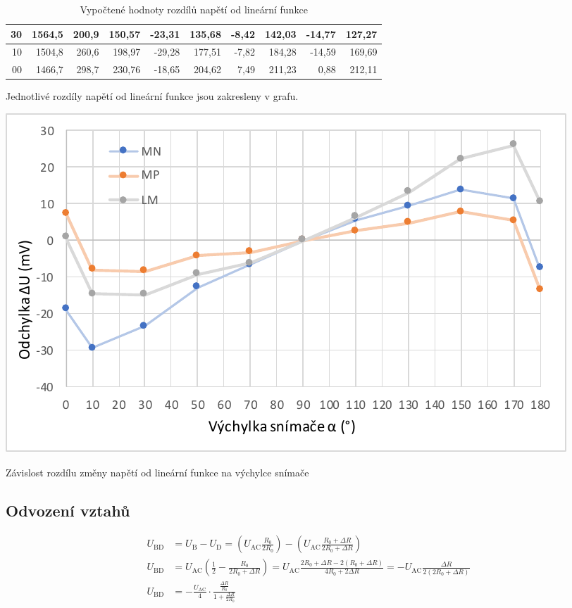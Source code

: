 \documentclass[a4paper,12pt]{article}   %
\begin{document}
\begin{table}[]
\begin{tabular}{|r|r|r||r|r||r|r||r|r||r|}
  30                       & 1564,5       & 200,9              & 150,57               & -23,31                    & 135,68               & -8,42                     & 142,03              & -14,77                    & 127,27     \\\hline
  10                       & 1504,8       & 260,6              & 198,97               & -29,28                    & 177,51               & -7,82                     & 184,28              & -14,59                    & 169,69     \\\hline
  00                        & 1466,7       & 298,7              & 230,76               & -18,65                    & 204,62               & 7,49                      & 211,23              & 0,88                      & 212,11    \\\hline
  \end{tabular}
  \caption{Vypočtené hodnoty rozdílů napětí od lineární funkce}
  \label{tab:master}
\end{table}


Jednotlivé rozdíly napětí od lineární funkce jsou zakresleny v grafu.
\begin{graf}
  \centering
  \includegraphics[width=\textwidth]{graf1.pdf}
  \caption{Závislost rozdílu změny napětí od lineární funkce na výchylce snímače}
  \label{gr:delta}
\end{graf}


\subsection{Odvození vztahů}
\begin{equation}
  \begin{split}
    U_\text{BD} &= U_\text{B} - U_\text{D} = \left(U_\text{AC}\frac{R_0}{2R_0}\right)-\left(U_\text{AC}\frac{R_0+\Delta R}{2R_0+\Delta R}\right)\\
    U_\text{BD} &= U_\text{AC}\left(\frac{1}{2}-\frac{R_0}{2R_0+\Delta R}\right) = U_\text{AC}\frac{2R_0+\Delta R -2(R_0+\Delta R)}{4R_0 + 2\Delta R} = -U_\text{AC}\frac{\Delta R}{2(2R_0+\Delta R)}\\
    U_\text{BD} &= -\frac{U_\text{AC}}{4}\cdot\frac{\frac{\Delta R}{R_0}}{1+\frac{\Delta R}{2R_0}}\\
  \end{split}
\end{equation}
\end{document}
